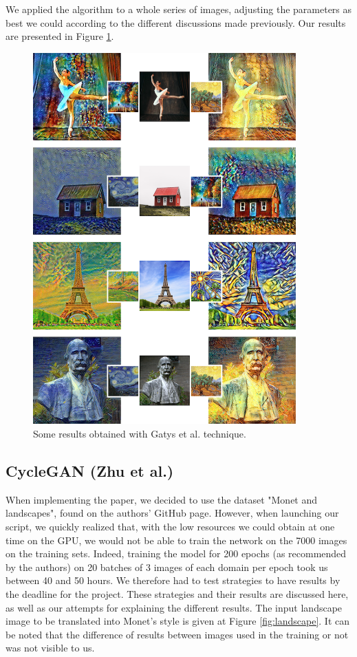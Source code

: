 \documentclass[twocolumn,superscriptaddress,aps,floatfix,nofootinbib]{revtex4-1}
\begin{document}
    We applied the algorithm to a whole series of images, adjusting the parameters as best we could according to the different discussions made previously. Our results are presented in Figure \ref{fig:final.results.gatys}.
    
    \begin{figure}
        \centering
        \includegraphics[width=0.90\textwidth]{resources/png/gatys-final.png}
        \caption{Some results obtained with Gatys et al. technique.}
        \label{fig:final.results.gatys}
    \end{figure}
    
    \subsection{CycleGAN (Zhu et al.)}\label{sec:results.zhu}
    
    When implementing the paper, we decided to use the dataset "Monet and landscapes", found on the authors' GitHub page\cite{cycgit}. However, when launching our script, we quickly realized that, with the low resources we could obtain at one time on the GPU, we would not be able to train the network on the 7000 images on the training sets. Indeed, training the model for 200 epochs (as recommended by the authors) on 20 batches of 3 images of each domain per epoch took us between 40 and 50 hours. We therefore had to test strategies to have results by the deadline for the project. These strategies and their results are discussed here, as well as our attempts for explaining the different results. The input landscape image to be translated into Monet's style is given at Figure \ref{fig:landscape}. It can be noted that the difference of results between images used in the training or not was not visible to us.
\end{document}
